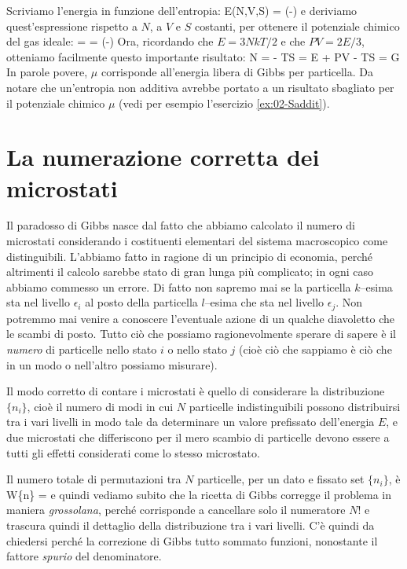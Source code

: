 Scriviamo l'energia in funzione dell'entropia:
\be
\label{eq:02-efs}
E(N,V,S) = \exp\left(-\right)
\ee
e deriviamo quest'espressione rispetto a $N$, a $V$ e $S$ costanti, per ottenere il potenziale chimico del gas ideale:
\be
\label{eq:02-mudef}
\mu =  = \left(-\right)
\ee
Ora, ricordando che $E = 3NkT/2$ e che $PV = 2E/3$, otteniamo facilmente questo importante risultato:
\be
\label{eq:02-muG}
\mu N =  - TS = E + PV - TS = G
\ee
In parole povere, $\mu$ corrisponde all'energia libera di Gibbs per particella. Da notare che un'entropia non additiva avrebbe portato a un risultato sbagliato per il potenziale chimico $\mu$ (vedi per esempio l'esercizio \ref{ex:02-Saddit}).

\section{La numerazione corretta dei microstati}
\label{sec:02-numerazione-corretta}

Il paradosso di Gibbs nasce dal fatto che abbiamo calcolato il numero di microstati considerando i costituenti elementari del sistema macroscopico come distinguibili. L'abbiamo fatto in ragione di un principio di economia, perché altrimenti il calcolo sarebbe stato di gran lunga più complicato; in ogni caso abbiamo commesso un errore. Di fatto non sapremo mai se la particella $k$--esima sta nel livello $\epsilon_{i}$ al posto della particella $l$--esima che sta nel livello $\epsilon_{j}$. Non potremmo mai venire a conoscere l'eventuale azione di un qualche diavoletto che le scambi di posto. Tutto ciò che possiamo ragionevolmente sperare di sapere è il {\em numero} di particelle nello stato $i$ o nello stato $j$ (cioè ciò che sappiamo è ciò che in un modo o nell'altro possiamo misurare).

Il modo corretto di contare i microstati è quello di considerare la distribuzione $\{n_{i}\}$, cioè il numero di modi in cui $N$ particelle indistinguibili possono distribuirsi tra i vari livelli in modo tale da determinare un valore prefissato dell'energia $E$, e due microstati che differiscono per il mero scambio di particelle devono essere a tutti gli effetti considerati come lo stesso microstato.

Il numero totale di permutazioni tra $N$ particelle, per un dato e fissato set $\{n_{i}\}$, è
\be
W\{n\} = 
\ee
e quindi vediamo subito che la ricetta di Gibbs corregge il problema in maniera {\em grossolana}, perché corrisponde a cancellare solo il numeratore $N!$ e trascura quindi il dettaglio della distribuzione tra i vari livelli. C'è quindi da chiedersi perché la correzione di Gibbs tutto sommato funzioni, nonostante il fattore {\em spurio} del denominatore.

